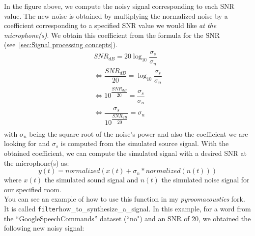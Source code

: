 \documentclass[11pt,a4paper,titlepage]{report}
\begin{document}
In the figure above, we compute the noisy signal corresponding to each SNR value. The new noise is obtained by multiplying the normalized noise by a coefficient corresponding to a specified SNR value we would like \emph{at the microphone(s)}. We obtain this coefficient from the formula for the SNR (see~\ref{sec:Signal processing concepts}).
\begin{align}
SNR_{dB} = 20\log_{10}{\dfrac{\sigma_{s}}{\sigma_{n}}}\\ 
\Leftrightarrow \dfrac{SNR_{dB}}{20} = \log_{10}{\dfrac{\sigma_{s}}{\sigma_{n}}}\\  
\Leftrightarrow 10^{\dfrac{SNR_{dB}}{20}} = \dfrac{\sigma_{s}}{\sigma_{n}}\\ 
\Leftrightarrow \dfrac{\sigma_{s}}{10^{\dfrac{SNR_{dB}}{20}}} = \sigma_{n}\\ 
\end{align}
with $\sigma_{n}$ being the square root of the noise's power and also the coefficient we are looking for and $\sigma_{s}$ is computed from the simulated source signal. With the obtained coefficient, we can compute the simulated signal with a desired SNR at the microphone(s) as:
\begin{equation}
y(t) = normalized(x(t) + \sigma_{n} * normalized(n(t)) )
\end{equation}
where $ x(t) $ the simulated sound signal and $ n(t) $ the simulated noise signal for our specified room.\\
\hspace*{0.6cm}
You can see an example of how to use this function in my \textit{pyroomacoustics} fork. It is called \texttt{filter}{how\_to\_synthesize\_a\_signal}. In this example, for a word from the ``GoogleSpeechCommands'' dataset (``no") and an SNR of 20, we obtained the following new noisy signal:
\end{document}

